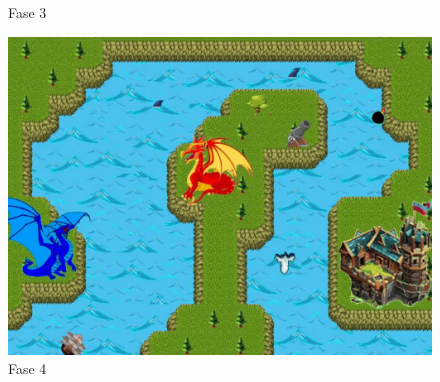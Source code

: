 \documentclass[a4paper,12pt]{article}
\begin{document}
\begin{figure}
\begin{center}
\caption{Fase 3}
\includegraphics[scale=0.30]{img4.pdf}
\caption{Fase 4}
\end{center}
\end{figure}
\end{document}

